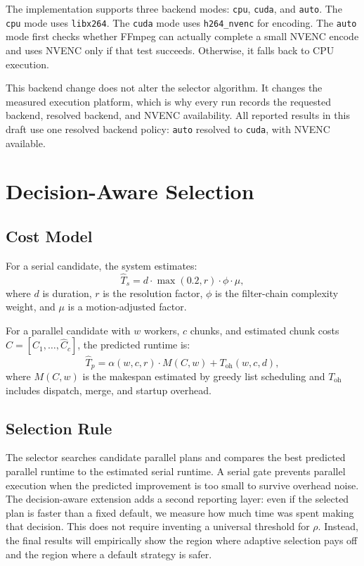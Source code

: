 \documentclass[conference]{IEEEtran}
\begin{document}
The implementation supports three backend modes: \texttt{cpu}, \texttt{cuda}, and \texttt{auto}.
The \texttt{cpu} mode uses \texttt{libx264}.
The \texttt{cuda} mode uses \texttt{h264\_nvenc} for encoding.
The \texttt{auto} mode first checks whether FFmpeg can actually complete a small NVENC encode and uses NVENC only if that test succeeds.
Otherwise, it falls back to CPU execution.

This backend change does not alter the selector algorithm.
It changes the measured execution platform, which is why every run records the requested backend, resolved backend, and NVENC availability.
All reported results in this draft use one resolved backend policy: \texttt{auto} resolved to \texttt{cuda}, with NVENC available.

\section{Decision-Aware Selection}

\subsection{Cost Model}

For a serial candidate, the system estimates:
\begin{equation}
\hat{T}_s = d \cdot \max(0.2, r) \cdot \phi \cdot \mu,
\label{eq:serial}
\end{equation}
where $d$ is duration, $r$ is the resolution factor, $\phi$ is the filter-chain complexity weight, and $\mu$ is a motion-adjusted factor.

For a parallel candidate with $w$ workers, $c$ chunks, and estimated chunk costs $C = [\hat{C}_1, \ldots, \hat{C}_c]$, the predicted runtime is:
\begin{equation}
\hat{T}_p = \alpha(w,c,r) \cdot M(C,w) + T_{\mathrm{oh}}(w,c,d),
\label{eq:parallel}
\end{equation}
where $M(C,w)$ is the makespan estimated by greedy list scheduling and $T_{\mathrm{oh}}$ includes dispatch, merge, and startup overhead.

\subsection{Selection Rule}

The selector searches candidate parallel plans and compares the best predicted parallel runtime to the estimated serial runtime.
A serial gate prevents parallel execution when the predicted improvement is too small to survive overhead noise.
The decision-aware extension adds a second reporting layer: even if the selected plan is faster than a fixed default, we measure how much time was spent making that decision.
This does not require inventing a universal threshold for $\rho$.
Instead, the final results will empirically show the region where adaptive selection pays off and the region where a default strategy is safer.
\end{document}
